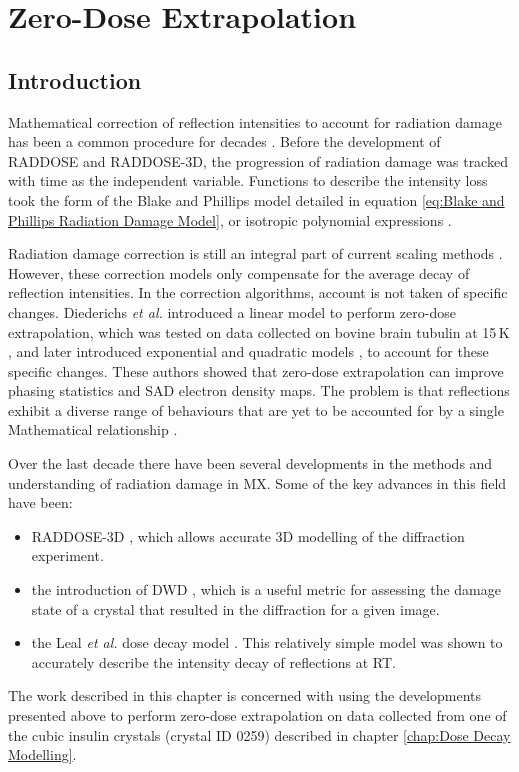 \chapter{Zero-Dose Extrapolation}
\label{chap:Zero-Dose Extrapolation}

\section{Introduction}
\label{sec:Introduction - Zero-Dose extrapolation}
Mathematical correction of reflection intensities to account for radiation damage has been a common procedure for decades \cite{hendrickson1973,abrahams1987anisotropy}.
Before the development of RADDOSE and RADDOSE-3D, the progression of radiation damage was tracked with time as the independent variable.
Functions to describe the intensity loss took the form of the Blake and Phillips model detailed in equation \ref{eq:Blake and Phillips Radiation Damage Model}, or isotropic polynomial expressions \cite{abrahams1987anisotropy}.

Radiation damage correction is still an integral part of current scaling methods \cite{otwinowski2003multiparametric,evans2005,kabsch2010integration}.
However, these correction models only compensate for the average decay of reflection intensities.
In the correction algorithms, account is not taken of specific changes.
Diederichs \textit{et al.}  introduced a linear model to perform zero-dose extrapolation, which was tested on data collected on bovine brain tubulin at 15$\,$K \cite{diederichs2003}, and later introduced exponential and quadratic models \cite{diederichs2006}, to account for these specific changes.
These authors showed that zero-dose extrapolation can improve phasing statistics and SAD electron density maps.
The problem is that reflections exhibit a diverse range of behaviours that are yet to be accounted for by a single Mathematical relationship \cite{blake1962,abrahams1973}.

Over the last decade there have been several developments in the methods and understanding of radiation damage in MX.
Some of the key advances in this field have been:
\begin{itemize}
    \item RADDOSE-3D \cite{zeldin2013}, which allows accurate 3D modelling of the diffraction experiment.
    \item the introduction of DWD \cite{zeldin2013dwd}, which is a useful metric for assessing the damage state of a crystal that resulted in the diffraction for a given image.
    \item the Leal \textit{et al.} dose decay model \cite{leal2012}. This relatively simple model was shown to accurately describe the intensity decay of reflections at RT.
\end{itemize}
The work described in this chapter is concerned with using the developments presented above to perform zero-dose extrapolation on data collected from one of the cubic insulin crystals (crystal ID 0259) described in chapter \ref{chap:Dose Decay Modelling}.
